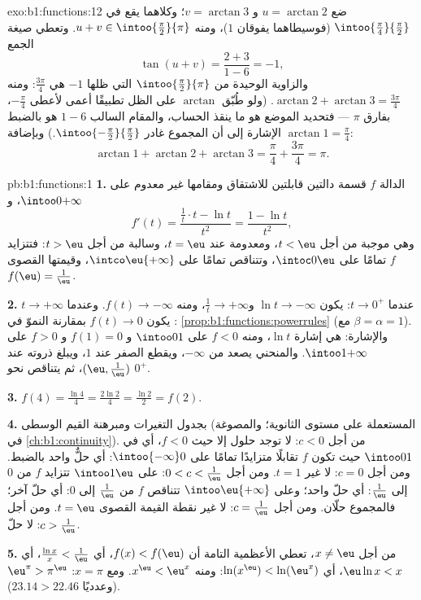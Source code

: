 \begin{solution}{exo:b1:functions:12}
ضع $u = \arctan 2$ و $v = \arctan 3$؛ وكلاهما يقع في
$\intoo{\frac\pi4}{\frac\pi2}$ (فوسيطاهما يفوقان $1$)، ومنه $u
+ v \in \intoo{\frac\pi2}{\pi}$. وتعطي صيغة الجمع
\[
\tan(u + v) = \frac{2 + 3}{1 - 6} = -1 ,
\]
والزاوية الوحيدة من $\intoo{\frac\pi2}{\pi}$ التي ظلها $-1$
هي $\frac{3\pi}4$: ومنه $\arctan 2 + \arctan 3 = \frac{3\pi}4$.
(ولو طُبّق $\arctan$ على الظل تطبيقًا أعمى لأعطى
$-\frac\pi4$، بفارق $\pi$ --- فتحديد الموضع هو ما ينقذ
الحساب، والمقام السالب $1 - 6$ هو بالضبط
الإشارة إلى أن المجموع غادر
$\intoo{-\frac\pi2}{\frac\pi2}$.) وبإضافة $\arctan 1 = \frac\pi4$:
\[
\arctan 1 + \arctan 2 + \arctan 3 = \frac\pi4 + \frac{3\pi}4 = \pi .
\]
\end{solution}

\begin{solution}{pb:b1:functions:1}
\textbf{1.} الدالة $f$ قسمة دالتين قابلتين للاشتقاق ومقامها
غير معدوم على $\intoo0{+\infty}$، و
\[
f'(t) = \frac{\frac1t \cdot t - \ln t}{t^2} = \frac{1 - \ln
t}{t^2} ,
\]
وهي موجبة من أجل $t < \eu$، ومعدومة عند $t = \eu$، وسالبة من أجل $t > \eu$:
فتتزايد $f$ تمامًا على $\intoc0\eu$، وتتناقص تمامًا على
$\intco\eu{+\infty}$، وقيمتها القصوى $f(\eu) = \frac1\eu$.

\textbf{2.} عندما $t \to 0^+$: يكون $\ln t \to -\infty$ و$\frac1t \to
+\infty$، ومنه $f(t) \to -\infty$. وعندما $t \to +\infty$: يكون $f(t) \to 0$
بمقارنة النموّ في \cref{prop:b1:functions:powerrules}
(مع $\beta = \alpha = 1$). والإشارة: هي إشارة $\ln t$، ومنه $f < 0$ على
$\intoo01$ و $f(1) = 0$ و $f > 0$ على $\intoo1{+\infty}$. والمنحني
يصعد من $-\infty$، ويقطع الصفر عند $1$، ويبلغ ذروته عند $(\eu,
\frac1\eu)$، ثم يتناقص نحو $0^+$.

\textbf{3.} $f(4) = \frac{\ln 4}4 = \frac{2\ln 2}4 = \frac{\ln 2}2
= f(2)$.

\textbf{4.} بجدول التغيرات ومبرهنة القيم
الوسطى (المستعملة على مستوى الثانوية؛ والمصوغة في
\cref{ch:b1:continuity}). من أجل $c < 0$: لا توجد حلول إلا حيث
$f < 0$، أي في $\intoo01$ حيث تكون $f$ تقابلًا متزايدًا
تمامًا على $\intoo{-\infty}0$: أي حلٌّ واحد بالضبط. ومن أجل $c = 0$: لا
غير $t = 1$. ومن أجل $0 < c < \frac1\eu$: على $\intoo1\eu$ تتزايد $f$
من $0$ إلى $\frac1\eu$: أي حلّ واحد؛ وعلى $\intoo\eu{+\infty}$
تتناقص $f$ من $\frac1\eu$ إلى $0$: أي حلّ آخر؛ فالمجموع حلّان. ومن أجل
$c = \frac1\eu$: لا غير نقطة القيمة القصوى $t = \eu$. ومن أجل $c >
\frac1\eu$: لا حلّ.

\textbf{5.} من أجل $x \neq \eu$، تعطي الأعظمية التامة أن $f(x) <
f(\eu)$، أي $\frac{\ln x}x < \frac1\eu$، أي $\eu\ln x < x$،
أي $\ln(x^\eu) < \ln(\eu^x)$: ومنه $x^\eu < \eu^x$. ومع $x = \pi$:
$\eu^\pi > \pi^\eu$ (وعدديًا $23.14 > 22.46$).


\end{solution}
